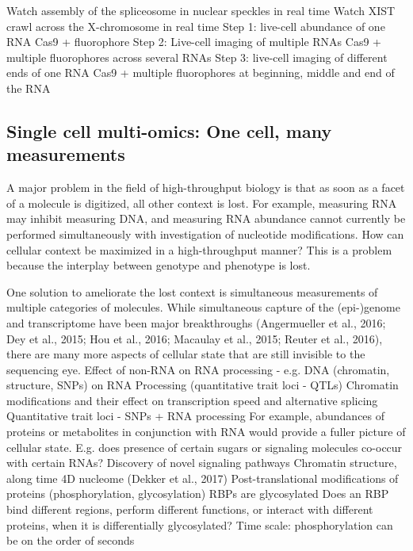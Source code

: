 Watch assembly of the spliceosome in nuclear speckles in real time
Watch XIST crawl across the X-chromosome in real time
Step 1: live-cell abundance of one RNA
Cas9 + fluorophore
Step 2: Live-cell imaging of multiple RNAs
Cas9 + multiple fluorophores across several RNAs
Step 3: live-cell imaging of different ends of one RNA
Cas9 + multiple fluorophores at beginning, middle and end of the RNA



\subsection{Single cell multi-omics: One cell, many measurements}

A major problem in the field of high-throughput biology is that as soon as a facet of a molecule is digitized, all other context is lost. For example, measuring RNA may inhibit measuring DNA, and measuring RNA abundance cannot currently be performed simultaneously with investigation of nucleotide modifications. How can cellular context be maximized in a high-throughput manner?
This is a problem because the interplay between genotype and phenotype is lost.

One solution to ameliorate the lost context is simultaneous measurements of multiple categories of molecules. While simultaneous capture of the (epi-)genome and transcriptome have been major breakthroughs (Angermueller et al., 2016; Dey et al., 2015; Hou et al., 2016; Macaulay et al., 2015; Reuter et al., 2016), there are many more aspects of cellular state that are still invisible to the sequencing eye.
Effect of non-RNA on RNA processing - e.g. DNA (chromatin, structure, SNPs) on RNA Processing (quantitative trait loci - QTLs)
Chromatin modifications and their effect on transcription speed and alternative splicing
Quantitative trait loci - SNPs + RNA processing
For example, abundances of proteins or metabolites in conjunction with RNA would provide a fuller picture of cellular state.
E.g. does presence of certain sugars or signaling molecules co-occur with certain RNAs? Discovery of novel signaling pathways
Chromatin structure, along time 4D nucleome (Dekker et al., 2017)
Post-translational modifications of proteins (phosphorylation, glycosylation)
RBPs are glycosylated
Does an RBP bind different regions, perform different functions, or interact with different proteins, when it is differentially glycosylated?
Time scale: phosphorylation can be on the order of seconds

